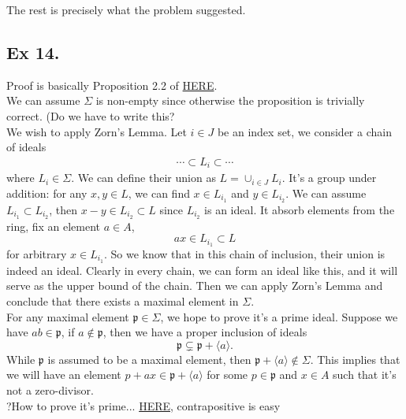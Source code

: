 The rest is precisely what the problem suggested.



\subsection{Ex 14.}

Proof is basically Proposition 2.2 of \href{https://www.jmilne.org/math/xnotes/CA.pdf}{HERE}.\\

We can assume $\Sigma$ is non-empty since otherwise the proposition is trivially correct.  (Do we have to write this?\\

We wish to apply Zorn's Lemma. Let $i\in J$ be an index set, we consider a chain of ideals
\begin{align*}
    \cdots\subset L_i\subset \cdots
\end{align*}where $L_i\in \Sigma$. We can define their union as $L=\cup_{i\in J} L_i$. 
It's a group under addition: for any $x,y\in L$, we can find $x\in L_{i_1}$ and $y\in L_{i_2}$. We can assume $L_{i_1}\subset L_{i_2}$, then $x-y\in L_{i_2}\subset L$ since $L_{i_2}$ is an ideal. It absorb elements from the ring, fix an element $a\in A$, 
$$ax\in L_{i_1}\subset L$$ for arbitrary $x\in L_{i_1}$. So we know that in this chain of inclusion, their union is indeed an ideal. Clearly in every chain, we can form an ideal like this, and it will serve as the upper bound of the chain. Then we can apply Zorn's Lemma and conclude that there exists a maximal element in $\Sigma$.\\

For any maximal element $\mathfrak p\in \Sigma$, we hope to prove it's a prime ideal.
Suppose we have $ab\in \mathfrak p$, if $a\notin \mathfrak p$, then we have a proper inclusion of ideals 
$$\mathfrak p\subsetneq \mathfrak p+\langle a\rangle.$$ While $\mathfrak p$ is assumed to be a maximal element, then $\mathfrak p+\langle a\rangle\notin \Sigma$. This implies that we will have an element $p+ax\in \mathfrak p+\langle a\rangle$ for some $p\in \mathfrak p$ and $x\in A$ such that it's not a zero-divisor. \\

?How to prove it's prime... \href{https://math.stackexchange.com/questions/44481/showing-the-set-of-zero-divisors-is-a-union-of-prime-ideals}{HERE}, contrapositive is easy \\

